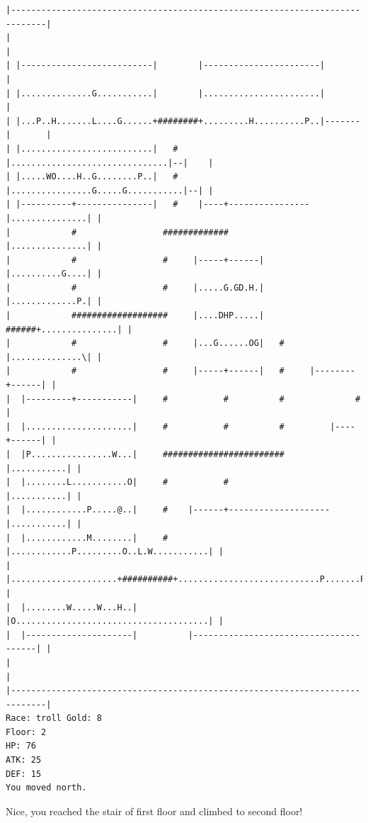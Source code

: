 \documentclass[11pt]{article}
\theoremstyle{plain}
\begin{document}
\begin{Verbatim}[fontsize=\scriptsize]
|-----------------------------------------------------------------------------|
|                                                                             |
| |--------------------------|        |-----------------------|               |
| |..............G...........|        |.......................|               |
| |...P..H.......L....G......+########+.........H..........P..|-------|       |
| |..........................|   #    |...............................|--|    |
| |.....WO....H..G........P..|   #    |................G.....G...........|--| |
| |----------+---------------|   #    |----+----------------|...............| |
|            #                 #############                |...............| |
|            #                 #     |-----+------|         |..........G....| |
|            #                 #     |.....G.GD.H.|         |.............P.| |
|            ###################     |....DHP.....|   ######+...............| |
|            #                 #     |...G......OG|   #     |..............\| |
|            #                 #     |-----+------|   #     |--------+------| |
|  |---------+-----------|     #           #          #              #        |
|  |.....................|     #           #          #         |----+------| |
|  |P................W...|     ########################         |...........| |
|  |........L...........O|     #           #                    |...........| |
|  |............P.....@..|     #    |------+--------------------|...........| |
|  |............M........|     #    |............P.........O..L.W...........| |
|  |.....................+##########+............................P.......P..| |
|  |........W.....W...H..|          |O......................................| |
|  |---------------------|          |---------------------------------------| |
|                                                                             |
|-----------------------------------------------------------------------------|
Race: troll Gold: 8                                                    Floor: 2
HP: 76
ATK: 25
DEF: 15
You moved north. 
\end{Verbatim}

Nice, you reached the stair of first floor and climbed to second floor!
\end{document}
